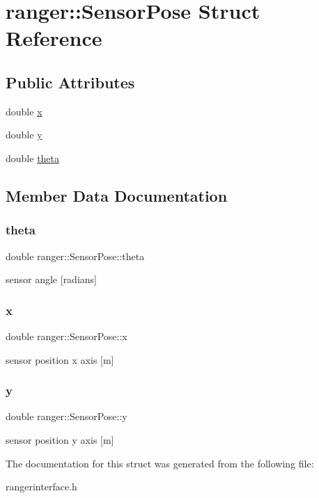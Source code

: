 \hypertarget{structranger_1_1SensorPose}{}\section{ranger\+:\+:Sensor\+Pose Struct Reference}
\label{structranger_1_1SensorPose}
\subsection*{Public Attributes}
\begin{DoxyCompactItemize}
\item 
double \hyperlink{structranger_1_1SensorPose_af3f4cc40667c93d56dd8e672c38a75e1}{x}
\item 
double \hyperlink{structranger_1_1SensorPose_ae7a4c48860c2e9f4fe7de03f8008026f}{y}
\item 
double \hyperlink{structranger_1_1SensorPose_a18751d4e746969c536714b372e3df1f6}{theta}
\end{DoxyCompactItemize}


\subsection{Member Data Documentation}
\mbox{\label{structranger_1_1SensorPose_a18751d4e746969c536714b372e3df1f6}} 
\subsubsection{\texorpdfstring{theta}{theta}}
{\footnotesize\ttfamily double ranger\+::\+Sensor\+Pose\+::theta}

sensor angle \mbox{[}radians\mbox{]} \mbox{\label{structranger_1_1SensorPose_af3f4cc40667c93d56dd8e672c38a75e1}} 
\subsubsection{\texorpdfstring{x}{x}}
{\footnotesize\ttfamily double ranger\+::\+Sensor\+Pose\+::x}

sensor position x axis \mbox{[}m\mbox{]} \mbox{\label{structranger_1_1SensorPose_ae7a4c48860c2e9f4fe7de03f8008026f}} 
\subsubsection{\texorpdfstring{y}{y}}
{\footnotesize\ttfamily double ranger\+::\+Sensor\+Pose\+::y}

sensor position y axis \mbox{[}m\mbox{]} 

The documentation for this struct was generated from the following file\+:\begin{DoxyCompactItemize}
\item 
rangerinterface.\+h\end{DoxyCompactItemize}
